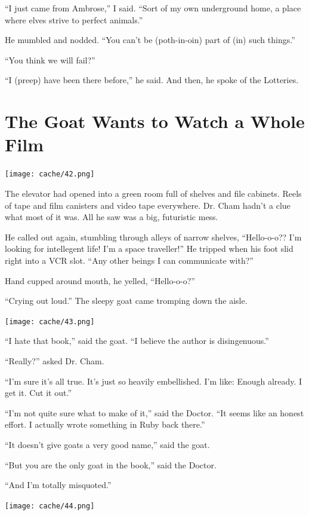 \documentclass[12pt,twoside]{report}
\begin{document}
``I just came from Ambrose,'' I said.  ``Sort of my own underground
home, a place where elves strive to perfect animals.''

He mumbled and nodded.  ``You can't be (poth-in-oin) part of (in) such
things.''

``You think we will fail?''

``I (preep) have been there before,'' he said.  And then, he spoke of
the Lotteries.

\newpage


\section{The Goat Wants to Watch a Whole Film}



	\texttt{[image: cache/42.png]}

The elevator had opened into a green room full of shelves and file
cabinets.  Reels of tape and film canisters and video tape everywhere.
Dr. Cham hadn't a clue what most of it was.  All he saw was a big,
futuristic mess.

He called out again, stumbling through alleys of narrow shelves,
``Hello-o-o??  I'm looking for intellegent life!  I'm a space
traveller!''  He tripped when his foot slid right into a VCR
slot. ``Any other beings I can communicate with?''

Hand cupped around mouth, he yelled, ``Hello-o-o?''

``Crying out loud.''  The sleepy goat came tromping down the aisle.

\newpage


	\texttt{[image: cache/43.png]}

``I hate that book,'' said the goat.  ``I believe the author is
        disingenuous.''

``Really?'' asked Dr. Cham.

``I'm sure it's all true.  It's just so heavily embellished.  I'm
        like: Enough already.  I get it.  Cut it out.''

``I'm not quite sure what to make of it,'' said the Doctor.  ``It
        seems like an honest effort. I actually wrote something in
        Ruby back there.''

``It doesn't give goats a very good name,'' said the goat.

``But you are the only goat in the book,'' said the Doctor.

``And I'm totally misquoted.''

	\texttt{[image: cache/44.png]}
\end{document}
